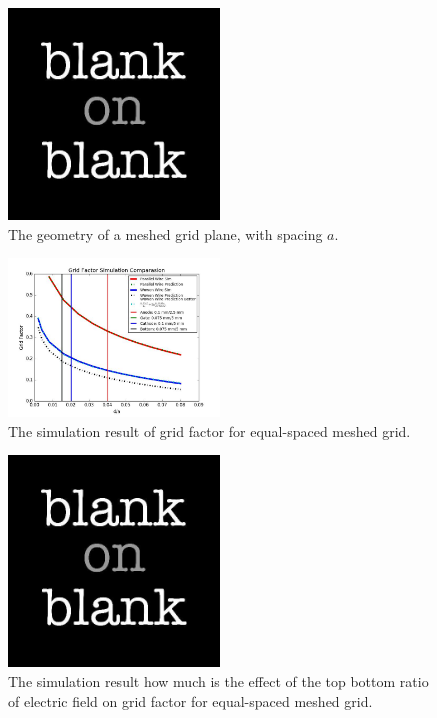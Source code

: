 \begin{figure}
\centering
\includegraphics[width=0.5\textwidth]{blank.jpg}
\caption{The geometry of a meshed grid plane, with spacing $a$.}
\label{fig: geo meshed}
\end{figure}

\begin{figure}
\centering
\includegraphics[width=0.5\textwidth]{Figures/A/GridFactor.jpg}
\caption{The simulation result of grid factor for equal-spaced meshed grid. }
\label{fig: g factor meshed}
\end{figure}

\begin{figure}
\centering
\includegraphics[width=0.5\textwidth]{blank.jpg}
\caption{The simulation result how much is the effect of the top bottom ratio of electric field on grid factor for equal-spaced meshed grid. }
\label{fig: Etop bottom effect meshed}
\end{figure}

